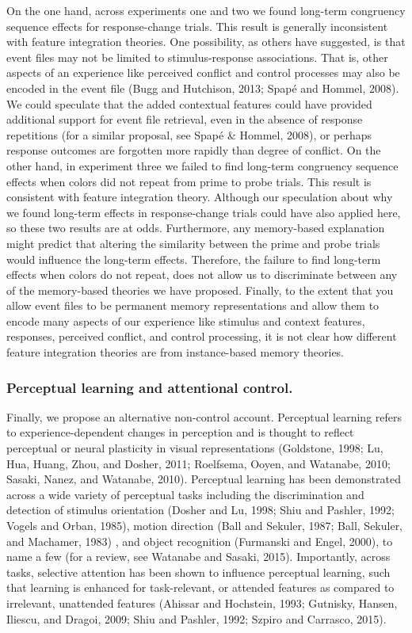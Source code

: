 \documentclass[]{DissertateCUNY}
\begin{document}
On the one hand, across experiments one and two we found long-term
congruency sequence effects for response-change trials. This result is
generally inconsistent with feature integration theories. One
possibility, as others have suggested, is that event files may not be
limited to stimulus-response associations. That is, other aspects of an
experience like perceived conflict and control processes may also be
encoded in the event file (Bugg and Hutchison, 2013; Spapé and Hommel,
2008). We could speculate that the added contextual features could have
provided additional support for event file retrieval, even in the
absence of response repetitions (for a similar proposal, see Spapé \&
Hommel, 2008), or perhaps response outcomes are forgotten more rapidly
than degree of conflict. On the other hand, in experiment three we
failed to find long-term congruency sequence effects when colors did not
repeat from prime to probe trials. This result is consistent with
feature integration theory. Although our speculation about why we found
long-term effects in response-change trials could have also applied
here, so these two results are at odds. Furthermore, any memory-based
explanation might predict that altering the similarity between the prime
and probe trials would influence the long-term effects. Therefore, the
failure to find long-term effects when colors do not repeat, does not
allow us to discriminate between any of the memory-based theories we
have proposed. Finally, to the extent that you allow event files to be
permanent memory representations and allow them to encode many aspects
of our experience like stimulus and context features, responses,
perceived conflict, and control processing, it is not clear how
different feature integration theories are from instance-based memory
theories.

\hypertarget{perceptual-learning-and-attentional-control.}{%
\subsubsection{Perceptual learning and attentional
control.}\label{perceptual-learning-and-attentional-control.}}

Finally, we propose an alternative non-control account. Perceptual
learning refers to experience-dependent changes in perception and is
thought to reflect perceptual or neural plasticity in visual
representations (Goldstone, 1998; Lu, Hua, Huang, Zhou, and Dosher,
2011; Roelfsema, Ooyen, and Watanabe, 2010; Sasaki, Nanez, and Watanabe,
2010). Perceptual learning has been demonstrated across a wide variety
of perceptual tasks including the discrimination and detection of
stimulus orientation (Dosher and Lu, 1998; Shiu and Pashler, 1992;
Vogels and Orban, 1985), motion direction (Ball and Sekuler, 1987; Ball,
Sekuler, and Machamer, 1983) , and object recognition (Furmanski and
Engel, 2000), to name a few (for a review, see Watanabe and Sasaki,
2015). Importantly, across tasks, selective attention has been shown to
influence perceptual learning, such that learning is enhanced for
task-relevant, or attended features as compared to irrelevant,
unattended features (Ahissar and Hochstein, 1993; Gutnisky, Hansen,
Iliescu, and Dragoi, 2009; Shiu and Pashler, 1992; Szpiro and Carrasco,
2015).
\end{document}
